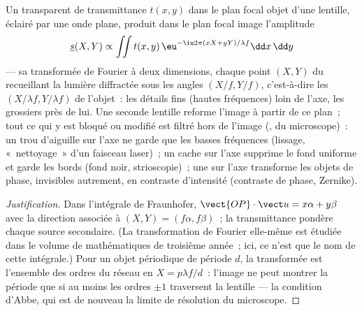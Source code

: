 \begin{proposition}\label{prop:b2:diffraction:fourier}
Un transparent de transmittance $t(x, y)$ dans le plan focal objet d'une
lentille, éclairé par une onde plane, produit dans le plan focal image
l'amplitude
\[
\underline s(X, Y) \propto \iint t(x, y)\,\eu^{-\iu2\pi(xX + yY)/\lambda f}\dd x\,\dd y
\]
--- sa transformée de Fourier à deux dimensions, chaque point $(X, Y)$ du
\emph{} recueillant la lumière diffractée sous les angles
$(X/f, Y/f)$, c'est-à-dire les \emph{} $(X/\lambda f, Y/\lambda f)$ de
l'objet~: les détails fins (hautes fréquences) loin de l'axe, les grossiers
près de lui. Une seconde lentille reforme l'image à partir de ce plan~; tout ce
qui y est bloqué ou modifié est filtré hors de l'image
(\emph{},  du microscope)~: un trou d'aiguille
sur l'axe ne garde que les basses fréquences (lissage, «~nettoyage~» d'un
faisceau laser)~; un cache sur l'axe supprime le fond uniforme et
garde les bords (fond noir, strioscopie)~; une  sur
l'axe transforme les objets de phase, invisibles autrement, en contraste d'intensité
(contraste de phase, Zernike).
\end{proposition}

\begin{proof}[Justification]
Dans l'intégrale de Fraunhofer, $\vect{OP}\cdot\vect u = x\alpha + y\beta$ avec la
direction associée à $(X, Y) = (f\alpha, f\beta)$~; la transmittance pondère
chaque source secondaire. (La transformation de Fourier elle-même est étudiée dans le
volume de mathématiques de troisième année~; ici, ce n'est que le nom de cette intégrale.)
Pour un objet périodique de période $d$, la transformée est l'ensemble des ordres du
réseau en $X = p\lambda f/d$~: l'image ne peut montrer la période que si au moins
les ordres $\pm1$ traversent la lentille --- la condition d'Abbe, qui est de nouveau
la limite de résolution du microscope.
\end{proof}

